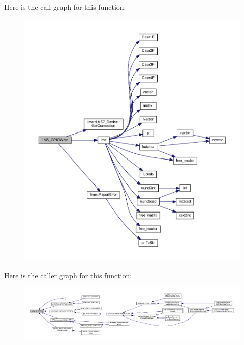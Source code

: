 Here is the call graph for this function\+:
\nopagebreak
\begin{figure}[H]
\begin{center}
\leavevmode
\includegraphics[width=350pt]{df/de1/lms7__api_8cpp_a4ff082a4601470c2d76f9fc93afe21dd_cgraph}
\end{center}
\end{figure}




Here is the caller graph for this function\+:
\nopagebreak
\begin{figure}[H]
\begin{center}
\leavevmode
\includegraphics[width=350pt]{df/de1/lms7__api_8cpp_a4ff082a4601470c2d76f9fc93afe21dd_icgraph}
\end{center}
\end{figure}


